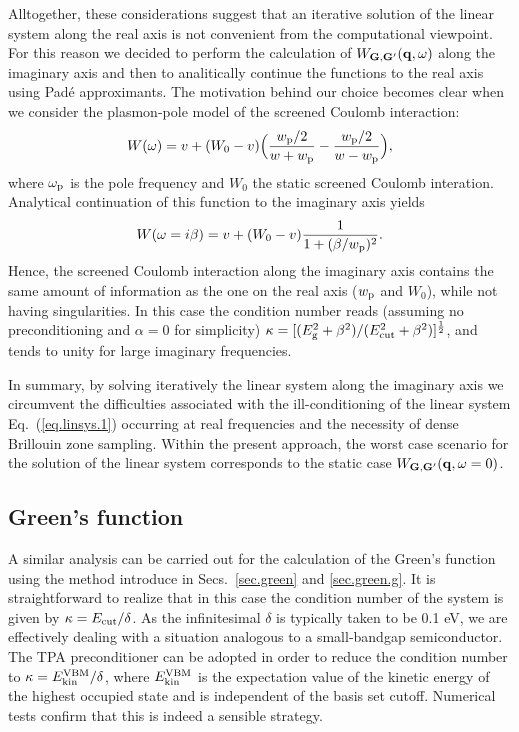 \documentclass[twocolumn,prb,showpacs,superscriptaddress]{revtex4}
\def\w{\omega}
\def\q{{\bf q}}
\def\G{{\bf G}}
\def\Gp{{\bf G^\prime}}
\begin{document}
Alltogether, these considerations suggest that an iterative solution of the
linear system along the real axis is not convenient from the computational
viewpoint. For this reason we decided to perform the calculation of $W_{\G,\Gp}(\q,\w)$
along the imaginary axis and then to analitically continue the functions
to the real axis using Pad\'e approximants.\cite{pade1,pade2,pade3}
The motivation behind our choice becomes clear when we consider the
plasmon-pole model of the screened Coulomb interaction:\cite{hl86}
  \begin{equation}
  W(\w) = v + (W_0 -v) \Big( \frac{w_{\rm p}/2}{w+w_{\rm p}} - \frac{w_{\rm p}/2}{w-w_{\rm p}} \Big),
  \end{equation}
where $\w_{\rm p}$ is the pole frequency and $W_0$ the static screened Coulomb interation.
Analytical continuation of this function to the imaginary axis yields
  \begin{equation} \label{eq.pp.im}
  W(\w=i\beta) = v + (W_0 -v) \frac{1}{1+(\beta/w_{\rm p})^2}.
  \end{equation}
Hence, the screened Coulomb interaction along the imaginary axis contains the same
amount of information as the one on the real axis ($w_{\rm p}$ and $W_0$), while
not having singularities. In this case the condition number reads
(assuming no preconditioning and $\alpha=0$ for simplicity) 
$\kappa=[(E_{\rm g}^2+\beta^2)/(E_{\rm cut}^2+\beta^2)]^\frac{1}{2}$,
and tends to unity for large imaginary frequencies.

In summary, by solving iteratively the linear system along the imaginary
axis we circumvent the difficulties associated with the ill-conditioning
of the linear system Eq.\ (\ref{eq.linsys.1}) occurring at real frequencies
and the necessity of dense Brillouin zone sampling.
Within the present approach, the worst case scenario for the solution 
of the linear system corresponds to the static case $W_{\G,\Gp}(\q,\w=0)$.

\subsection{Green's function}

A similar analysis can be carried out for the calculation of the Green's
function using the method introduce in Secs.\ \ref{sec.green} and \ref{sec.green.g}.
It is straightforward to realize that in this case the condition number
of the system is given by $\kappa = E_{\rm cut}/\delta$.
As the infinitesimal $\delta$ is typically taken to be 0.1 eV, we are effectively
dealing with a situation analogous to a small-bandgap semiconductor.
The TPA preconditioner can be adopted in order to reduce the condition number
to $\kappa = E_{\rm kin}^{\rm VBM}/\delta$, where $E_{\rm kin}^{\rm VBM}$
is the expectation value of the kinetic energy of the highest occupied state
and is independent of the basis set cutoff. Numerical tests confirm that this 
is indeed a sensible strategy.
\end{document}
